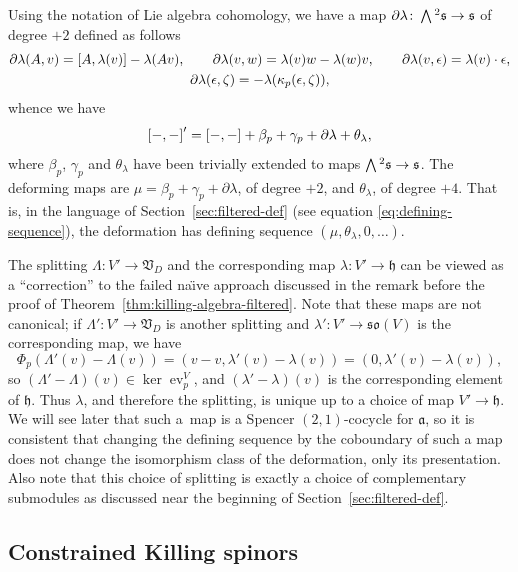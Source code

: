 \documentclass[11pt]{article}
\numberwithin{equation}{section}
\numberwithin{equation}{section}
\newcommand{\fa}{\mathfrak{a}}
\newcommand{\fh}{\mathfrak{h}}
\newcommand{\fs}{\mathfrak{s}}
\newcommand{\fso}{\mathfrak{so}}
\newcommand{\fV}{\mathfrak{V}}
\newcommand{\Wedge}{\mathchoice{{\textstyle\bigwedge}}{\bigwedge}{\bigwedge}{\bigwedge}}	%
\newcommand{\1}{\mathbbm{1}}
\DeclareMathOperator{\evaluate}{ev}
\begin{document}
Using the notation of Lie algebra cohomology, we have a map $\partial\lambda\colon\Wedge^2\fs\to\fs$ of degree $+2$ defined as follows
\begin{gather*}
	\partial\lambda(A,v) = \comm{A}{\lambda(v)}-\lambda(Av),\qquad
	 \partial\lambda(v,w) = \lambda(v)w-\lambda(w)v,\qquad
	\partial\lambda(v,\epsilon)	= \lambda(v)\cdot\epsilon,\\
	 \partial\lambda(\epsilon,\zeta)	= -\lambda(\kappa_p(\epsilon,\zeta)),
\end{gather*}
whence we have
\[
	\comm{-}{-}' = \comm{-}{-} + \beta_p + \gamma_p + \partial\lambda + \theta_\lambda,
\]
where $\beta_p$, $\gamma_p$ and $\theta_\lambda$ have been trivially extended to maps $\Wedge^2\fs\to\fs$. The deforming maps are $\mu = \beta_p + \gamma_p+\partial\lambda$, of degree $+2$, and $\theta_\lambda$, of degree $+4$. That is, in the language of Section~\ref{sec:filtered-def} (see equation \eqref{eq:defining-sequence}), the deformation has defining sequence $(\mu,\theta_\lambda,0,\dots)$.

The splitting $\Lambda\colon V'\to \fV_D$ and the corresponding map $\lambda \colon V'\to\fh$ can be viewed as a ``correction'' to the failed na\"{\i}ve approach discussed in the remark before the proof of Theorem~\ref{thm:killing-algebra-filtered}. Note that these maps are not canonical; if $\Lambda'\colon V'\to\fV_D$ is another splitting and $\lambda'\colon V'\to\fso(V)$ is the corresponding map, we have
\[
	\Phi_p(\Lambda'(v)-\Lambda(v)) = (v-v,\lambda'(v)-\lambda(v)) = (0,\lambda'(v)-\lambda(v)),
\]
so $(\Lambda'-\Lambda)(v)\in\ker\evaluate^V_p$, and $(\lambda'-\lambda)(v)$ is the corresponding element of $\fh$. Thus $\lambda$, and therefore the splitting, is unique up to a choice of map $V'\to\fh$. We will see later that such a~map is a Spencer $(2,1)$-cocycle for $\fa$, so it is consistent that changing the defining sequence by the coboundary of such a map does not change the isomorphism class of the deformation, only its presentation. Also note that this choice of splitting is exactly a choice of complementary submodules as discussed near the beginning of Section~\ref{sec:filtered-def}.

\subsection{Constrained Killing spinors}
\label{sec:alg-kse}
\end{document}
